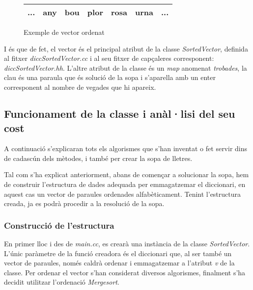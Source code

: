 \documentclass[titlepage]{article}
\begin{document}
\begin{center}
    \begin{figure}[h!]
        \begin{center}
            \begin{tabular}{ |c|c|c|c|c|c|c| } 
             \hline
                 ... & any & bou & plor & rosa & urna & ...\\ 
             \hline
            \end{tabular}
        \end{center}
            \caption{Exemple de vector ordenat}
            \label{fig:sortedVector}
    \end{figure}
\end{center}

I és que de fet, el vector és el principal atribut de la classe \textit{SortedVector}, definida al fitxer \textit{diccSortedVector.cc} i al seu fitxer de capçaleres corresponent: \textit{diccSortedVector.hh}. L'altre atribut de la classe és un \textit{map} anomenat \textit{trobades}, la clau és una paraula que és solució de la sopa i s'aparella amb un enter corresponent al nombre de vegades que hi apareix.
\newline\par

\subsection{Funcionament de la classe i anàl·lisi del seu cost}

A continuació s'explicaran tots els algorismes que s'han inventat o fet servir dins de cadascún dels mètodes, i també per crear la sopa de lletres.\newline

Tal com s'ha explicat anteriorment, abans de començar a solucionar la sopa, hem de construir l'estructura de dades adequada per emmagatzemar el diccionari, en aquest cas un vector de paraules ordenades alfabèticament. Tenint l'estructura creada, ja es podrà procedir a la resolució de la sopa.

\subsubsection{Construcció de l'estructura}
En primer lloc i des de \textit{main.cc}, es crearà una instància de la classe \textit{SortedVector}. L'únic paràmetre de la funció creadora és el diccionari que, al ser també un vector de paraules, només caldrà ordenar i emmagatzemar a l'atribut \textit{v} de la classe. Per ordenar el vector s'han considerat diversos algorismes, finalment s'ha decidit utilitzar l'ordenació \textit{Mergesort}.
\end{document}
